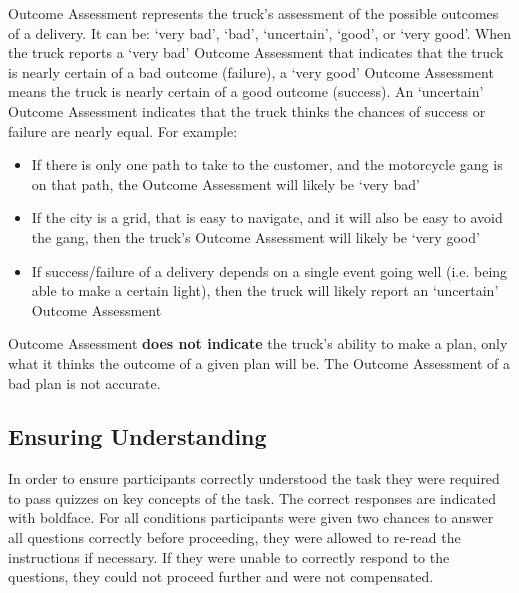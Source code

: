 \begin{quoting}
    Outcome Assessment represents the truck's assessment of the possible outcomes of a delivery. It can be: `very bad', `bad', `uncertain', `good', or `very good'. When the truck reports a `very bad' Outcome Assessment that indicates that the truck is nearly certain of a bad outcome (failure), a `very good' Outcome Assessment means the truck is nearly certain of a good outcome (success). An `uncertain' Outcome Assessment indicates that the truck thinks the chances of success or failure are nearly equal. For example:

    \begin{itemize}
        \item If there is only one path to take to the customer, and the motorcycle gang is on that path, the Outcome Assessment will likely be `very bad'
        \item If the city is a grid, that is easy to navigate, and it will also be easy to avoid the gang, then the truck's Outcome Assessment will likely be `very good'
        \item If success/failure of a delivery depends on a single event going well (i.e. being able to make a certain light), then the truck will likely report an `uncertain' Outcome Assessment
    \end{itemize}

    Outcome Assessment \textbf{does not indicate} the truck's ability to make a plan, only what it thinks the outcome of a given plan will be. The Outcome Assessment of a bad plan is not accurate.
\end{quoting}

\subsection{Ensuring Understanding}
In order to ensure participants correctly understood the task they were required to pass quizzes on key concepts of the task. The correct responses are indicated with boldface. For all conditions participants were given two chances to answer all questions correctly before proceeding, they were allowed to re-read the instructions if necessary. If they were unable to correctly respond to the questions, they could not proceed further and were not compensated.

